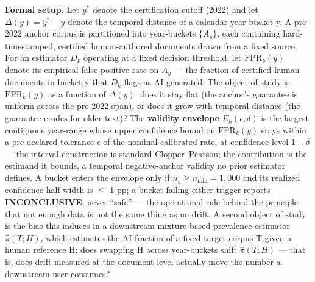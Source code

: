 \documentclass[conference]{IEEEtran}
\begin{document}
\noindent\textbf{Formal setup.} Let $y^*$ denote the certification cutoff (2022) and let $\Delta(y) = y^* - y$ denote the temporal distance of a calendar-year bucket y. A pre-2022 anchor corpus is partitioned into year-buckets $\{A_y\}$, each containing hard-timestamped, certified human-authored documents drawn from a fixed source. For an estimator $D_k$ operating at a fixed decision threshold, let $\mathrm{FPR}_k(y)$ denote its empirical false-positive rate on $A_y$ --- the fraction of certified-human documents in bucket y that $D_k$ flags as AI-generated. The object of study is $\mathrm{FPR}_k(y)$ as a function of $\Delta(y)$: does it stay flat (the anchor's guarantee is uniform across the pre-2022 span), or does it grow with temporal distance (the guarantee erodes for older text)? The \textbf{validity envelope} $E_k(\epsilon, \delta)$ is the largest contiguous year-range whose upper confidence bound on $\mathrm{FPR}_k(y)$ stays within a pre-declared tolerance $\epsilon$ of the nominal calibrated rate, at confidence level $1-\delta$ --- the interval construction is standard Clopper--Pearson; the contribution is the estimand it bounds, a temporal negative-anchor validity no prior estimator defines. A bucket enters the envelope only if $n_y \geq n_{\min} = 1{,}000$ and its realized confidence half-width is $\leq$ 1 pp; a bucket failing either trigger reports \textbf{INCONCLUSIVE}, never ``safe'' --- the operational rule behind the principle that not enough data is not the same thing as no drift. A second object of study is the bias this induces in a downstream mixture-based prevalence estimator $\hat{\pi}(T; H)$, which estimates the AI-fraction of a fixed target corpus T given a human reference H: does swapping H across year-buckets shift $\hat{\pi}(T; H)$ --- that is, does drift measured at the document level actually move the number a downstream user consumes?
\end{document}
